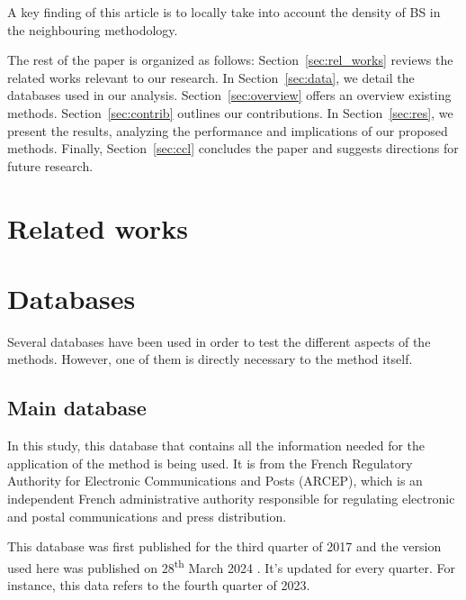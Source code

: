 \documentclass[lettersize,journal,english]{IEEEtran}
\begin{document}
    A key finding of this article is to locally take into account the density of BS in the neighbouring methodology.

    The rest of the paper is organized as follows: Section~\ref{sec:rel_works} reviews the related works relevant to our research. In Section~\ref{sec:data}, we detail the databases used in our analysis. Section~\ref{sec:overview} offers an overview existing methods. Section~\ref{sec:contrib} outlines our contributions. In Section~\ref{sec:res}, we present the results, analyzing the performance and implications of our proposed methods. Finally, Section~\ref{sec:ccl} concludes the paper and suggests directions for future research.

\section{Related works\label{sec:rel_works}}
    \noindent 

\section{Databases\label{sec:data}}
    \noindent Several databases have been used in order to test the different aspects of the methods. However, one of them is directly necessary to the method itself.

    \subsection{Main database}
        In this study, this database \cite{main_database} that contains all the information needed for the application of the method is being used. It is from the French Regulatory Authority for Electronic Communications and Posts (ARCEP), which is an independent French administrative authority responsible for regulating electronic and postal communications and press distribution.

        This database was first published for the third quarter of 2017 and the version used here was published on 28\textsuperscript{th} March 2024 \cite{main_database_hist}.
        It's updated for every quarter. For instance, this data refers to the fourth quarter of 2023.
\end{document}

